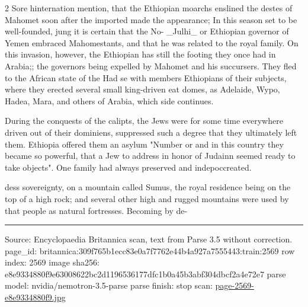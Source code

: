 \documentclass[10pt]{article}
\begin{document}
\begin{multicols}{2}
Sore hinternation mention, that the Ethiopian moarchs enslined the destes of Mahomet soon after the imported made the appearance; In this season set to be well-founded, jung it is certain that the No- \_Julhi\_ or Ethiopian governor of Yemen embraced Mahomestants, and that he was related to the royal family. On this invasion, however, the Ethiopian has still the footing they once had in Arabia;; the governors being expelled by Mahomet and his succursers. They fled to the African state of the Had se with members Ethiopians of their subjects, where they erected several small king-driven eat domes, as Adelaide, Wypo, Hadea, Mara, and others of Arabia, which side continues.

During the conquests of the calipts, the Jews were for some time everywhere driven out of their dominiens, suppressed such a degree that they ultimately left them. Ethiopia offered them an asylum "Number or and in this country they became so powerful, that a Jew to address in honor of Judainn seemed ready to take objects". One family had always preserved and indepoccreated.

dess sovereignty, on a mountain called Sumus, the royal residence being on the top of a high rock; and several other high and rugged mountains were used by that people as natural fortresses. Becoming by de-

\end{multicols}
\vfill\par\noindent\rule{\linewidth}{0.4pt}\par
{\scriptsize\color{gray}\noindent Source: Encyclopaedia Britannica scan, text from Parse 3.5 without correction. page\_id: britannica:309f765b1ecc83e0a7f7762e44b4a927a7555443:train:2569 \quad row index: 2569 \quad image sha256: e8e9334880f9e63008622bc2d1196536177dfc1b0a45b3abf304dbcf2a4e72e7 \quad parse model: nvidia/nemotron-3.5-parse \quad parse finish: stop \quad scan: \href{../scans/page-2569-e8e9334880f9.jpg}{page-2569-e8e9334880f9.jpg}\par}
\end{document}
